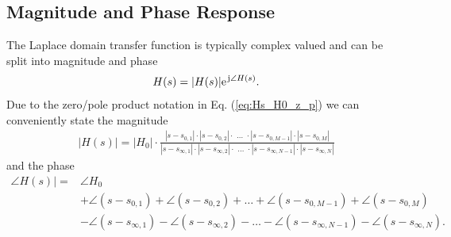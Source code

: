 \documentclass[a4paper,11pt,oneside]{scrartcl}
\newcommand{\eq}[1]{Eq. (\ref{#1})}
\begin{document}
\subsection{Magnitude and Phase Response}
The Laplace domain transfer function is typically complex valued and can be
split into magnitude and phase
\begin{align}
H(s) = |H(s)| \e^{\im \angle H(s)}.
\end{align}
%
Due to the zero/pole product notation in \eq{eq:Hs_H0_z_p}
we can conveniently state the magnitude
\begin{align}
\label{eq:Hs_H0_z_p_mag}
|H(s)| = |H_0| \cdot \frac
{|s-s_{0,1}| \cdot |s-s_{0,2}| \cdot  \,\,\dots \,\,\cdot  |s-s_{0,M-1}| \cdot  |s-s_{0,M}|}
{|s-s_{\infty,1}| \cdot  |s-s_{\infty,2}| \cdot  \,\,\dots\,\, \cdot |s-s_{\infty,N-1}| \cdot |s-s_{\infty,N}|}
\end{align}
and the phase
\begin{align}
\label{eq:Hs_H0_z_p_phase}
\angle H(s)| =& \angle H_0\\
&
+\angle (s-s_{0,1})
+\angle (s-s_{0,2})
+\dots
+\angle (s-s_{0,M-1})
+\angle (s-s_{0,M})\\
&
-\angle (s-s_{\infty,1})
-\angle (s-s_{\infty,2})
-\dots
-\angle (s-s_{\infty,N-1})
-\angle (s-s_{\infty,N}).
\end{align}
\end{document}

